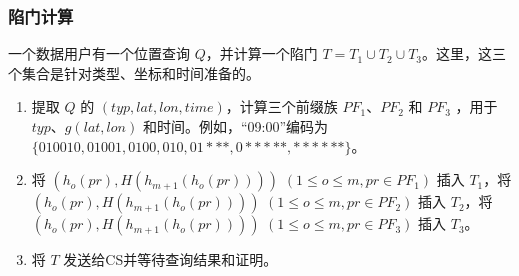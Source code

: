 \documentclass{cumcmthesis}
\numberwithin{equation}{section} %
\numberwithin{figure}{section} %
\numberwithin{table}{section} %
\begin{document}
\subsubsection{陷门计算}
一个数据用户有一个位置查询 $Q$，并计算一个陷门 $T = T_1 \cup T_2 \cup T_3$。这里，这三个集合是针对类型、坐标和时间准备的。
\begin{enumerate}
    \item 提取 $Q$ 的 $(typ, lat, lon, time)$，计算三个前缀族 $PF_1$、$PF_2$ 和 $PF_3$ ，用于 $typ$、$g(lat, lon)$ 和时间。例如，“09:00”编码为 $\{010010, 01001, 0100, 010, 01***, 0*****, ******\}$。
    \item 将 $(h_o(pr), H(h_{m + 1}(h_o(pr))))$ $(1\leq o\leq m, pr\in PF_1)$ 插入 $T_1$，将 $(h_o(pr), H(h_{m + 1}(h_o(pr))))$ $(1 \leq o \leq m, pr\in PF_2)$ 插入 $T_2$，将 $(h_o(pr), H(h_{m + 1}(h_o(pr))))$ $(1 \leq o \leq m, pr\in PF_3)$ 插入 $T_3$。
    \item 将 $T$ 发送给CS并等待查询结果和证明。
\end{enumerate}
\end{document}
